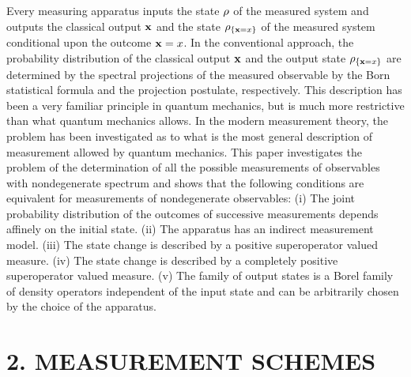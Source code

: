 Every measuring apparatus inputs the state $\rho$ of the measured system
and outputs the classical output ${\bf x}$ and the state $\rho_{\{{\bf x}=x\}}$
of the measured system conditional upon the outcome ${\bf x}=x$.
In the conventional approach, the probability distribution of the 
classical output ${\bf x}$ and the output state $\rho_{\{{\bf x}=x\}}$
are determined by the spectral projections of the measured observable 
by the Born statistical formula and the projection postulate, respectively.
This description has been a very familiar principle in quantum mechanics,
but is much more restrictive than what quantum mechanics allows. 
In the modern measurement theory, the problem has been investigated
as to what is the most general description of measurement allowed by 
quantum mechanics.  This paper investigates the problem of the
determination of all the possible measurements of observables with
nondegenerate spectrum and shows that the following conditions 
are equivalent for measurements of nondegenerate 
observables: (i) The joint 
probability distribution of the outcomes of successive measurements depends 
affinely on the initial state. (ii) The apparatus has an indirect 
measurement model. (iii) The state change is described by a positive 
superoperator valued measure. (iv) The state change is described by 
a completely positive superoperator valued measure.  
(v) The family of output states is a Borel family of density operators
independent of the input state and can be arbitrarily chosen 
by the choice of the apparatus. 

\section*{2. MEASUREMENT SCHEMES}

